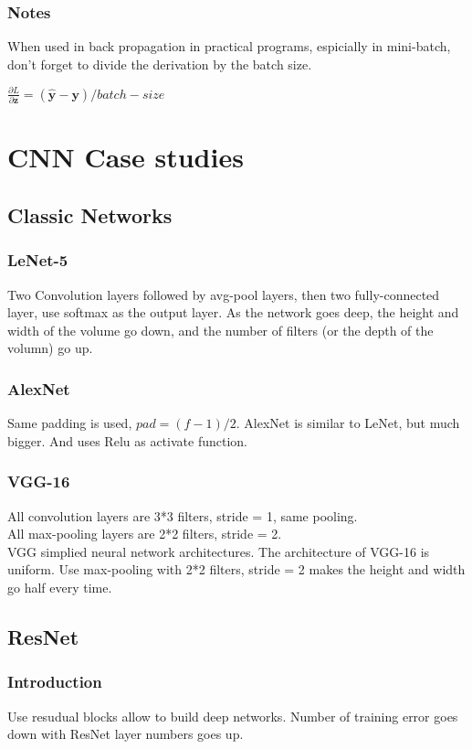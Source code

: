 \documentclass{article}
\begin{document}
		\subsubsection{Notes}
			\begin{flushleft}
				When used in back propagation in practical programs, espicially in mini-batch, don't forget to divide the derivation by the batch size.
			\end{flushleft}
			\begin{center}
				$\frac{\partial L}{\partial \bm{z}}= (\bm{\hat{y}} - \bm{y})/batch-size$
			\end{center}
\section{CNN Case studies}
	\subsection{Classic Networks}
		\subsubsection{LeNet-5}
			Two Convolution layers followed by avg-pool layers, then two fully-connected layer, use softmax as the output layer. As the network goes deep,
the height and width of the volume go down, and the number of filters (or the depth of the volumn) go up.
		\subsubsection{AlexNet}
			Same padding is used, $pad = (f - 1)/2$. AlexNet is similar to LeNet, but much bigger. And uses Relu as activate function.
		\subsubsection{VGG-16}
			All convolution layers are 3*3 filters, stride = 1, same pooling.\\
			All max-pooling layers are 2*2 filters, stride = 2.\\
			VGG simplied neural network architectures. The architecture of VGG-16 is uniform. Use max-pooling with 2*2 filters, stride = 2 makes the height and width go half every time.
	\subsection{ResNet}
		\subsubsection{Introduction}
			Use resudual blocks allow to build deep networks. Number of training error goes down with ResNet layer numbers goes up.
\end{document}
